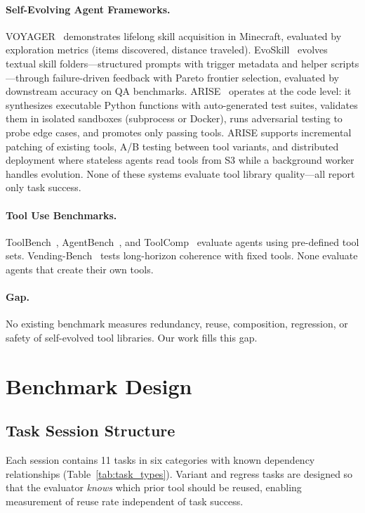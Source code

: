 \documentclass[10pt,twocolumn]{article}
\begin{document}
\paragraph{Self-Evolving Agent Frameworks.} VOYAGER~\cite{wang2023voyager} demonstrates lifelong skill acquisition in Minecraft, evaluated by exploration metrics (items discovered, distance traveled). EvoSkill~\cite{alzubi2026evoskill} evolves textual skill folders---structured prompts with trigger metadata and helper scripts---through failure-driven feedback with Pareto frontier selection, evaluated by downstream accuracy on QA benchmarks. ARISE~\cite{kaliyev2026arise} operates at the code level: it synthesizes executable Python functions with auto-generated test suites, validates them in isolated sandboxes (subprocess or Docker), runs adversarial testing to probe edge cases, and promotes only passing tools. ARISE supports incremental patching of existing tools, A/B testing between tool variants, and distributed deployment where stateless agents read tools from S3 while a background worker handles evolution. None of these systems evaluate tool library quality---all report only task success.

\paragraph{Tool Use Benchmarks.} ToolBench~\cite{qin2023toolbench}, AgentBench~\cite{liu2024agentbench}, and ToolComp~\cite{toolcomp2025} evaluate agents using pre-defined tool sets. Vending-Bench~\cite{backlund2025vendingbench} tests long-horizon coherence with fixed tools. None evaluate agents that create their own tools.

\paragraph{Gap.} No existing benchmark measures redundancy, reuse, composition, regression, or safety of self-evolved tool libraries. Our work fills this gap.

\section{Benchmark Design}

\subsection{Task Session Structure}

Each session contains 11 tasks in six categories with known dependency relationships (Table~\ref{tab:task_types}). Variant and regress tasks are designed so that the evaluator \emph{knows} which prior tool should be reused, enabling measurement of reuse rate independent of task success.
\end{document}

